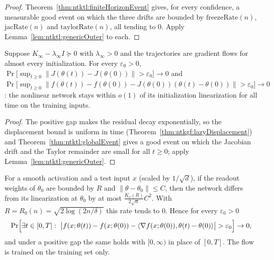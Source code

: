 \begin{proof}
  \leanok
Theorem~\ref{thm:ntktl:finiteHorizonEvent} gives, for every confidence, a measurable good event on which the three drifts are bounded by $\mathrm{freezeRate}(n)$, $\mathrm{jacRate}(n)$ and $\mathrm{taylorRate}(n)$, all tending to $0$. Apply Lemma~\ref{lem:ntktl:genericOuter} to each.
\end{proof}

\begin{theorem}\label{thm:ntktl:globalDriftLimits}
  \leanok
Suppose $K_\infty-\lambda_\infty I\succeq0$ with $\lambda_\infty>0$ and the trajectories are gradient flows for almost every initialization. For every $\varepsilon_0>0$, $\Pr\bigl[\sup_{t\ge0}\|J(\theta(t))-J(\theta(0))\|>\varepsilon_0\bigr]\to0$ and
$\Pr\bigl[\sup_{t\ge0}\|f(\theta(t))-f(\theta(0))-J(\theta(0))(\theta(t)-\theta(0))\|>\varepsilon_0\bigr]\to0$: the nonlinear network stays within $o(1)$ of its initialization linearization for all time on the training inputs.
\end{theorem}

\begin{proof}
  \leanok
The positive gap makes the residual decay exponentially, so the displacement bound is uniform in time (Theorem~\ref{thm:ntkgf:lazyDisplacement}) and Theorem~\ref{thm:ntktl:globalEvent} gives a good event on which the Jacobian drift and the Taylor remainder are small for all $t\ge0$; apply Lemma~\ref{lem:ntktl:genericOuter}.
\end{proof}

\begin{theorem}\label{thm:ntktl:testLinearization}
  \leanok
For a smooth activation and a test input $x$ (scaled by $1/\sqrt d$), if the readout weights of $\theta_0$ are bounded by $R$ and $\|\theta-\theta_0\|\le C$, then the network differs from its linearization at $\theta_0$ by at most $\frac{K_x(R)}{2\sqrt n}C^2$. With $R=R_0(n)=\sqrt{2\log(2n/\delta)}$ this rate tends to $0$. Hence for every $\varepsilon_0>0$
\[
  \Pr\Bigl[\exists t\in[0,T]:\ \bigl|f(x;\theta(t))-f(x;\theta(0))-\langle\nabla f(x;\theta(0)),\theta(t)-\theta(0)\rangle\bigr|>\varepsilon_0\Bigr]\to0,
\]
and under a positive gap the same holds with $[0,\infty)$ in place of $[0,T]$. The flow is trained on the training set only.
\end{theorem}

